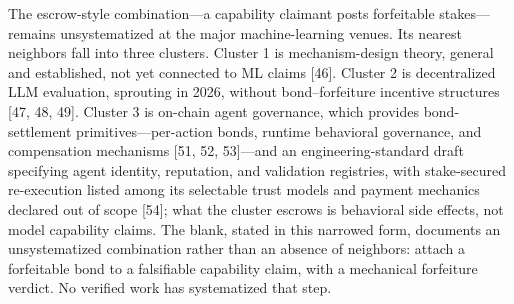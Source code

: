 \documentclass[11pt]{article}
\begin{document}
\noindent The escrow-style combination—a capability claimant posts forfeitable stakes—remains unsystematized at the major machine-learning venues. Its nearest neighbors fall into three clusters. Cluster 1 is mechanism-design theory, general and established, not yet connected to ML claims [46]. Cluster 2 is decentralized LLM evaluation, sprouting in 2026, without bond–forfeiture incentive structures [47, 48, 49]. Cluster 3 is on-chain agent governance, which provides bond-settlement primitives—per-action bonds, runtime behavioral governance, and compensation mechanisms [51, 52, 53]—and an engineering-standard draft specifying agent identity, reputation, and validation registries, with stake-secured re-execution listed among its selectable trust models and payment mechanics declared out of scope [54]; what the cluster escrows is behavioral side effects, not model capability claims. The blank, stated in this narrowed form, documents an unsystematized combination rather than an absence of neighbors: attach a forfeitable bond to a falsifiable capability claim, with a mechanical forfeiture verdict. No verified work has systematized that step.\par
\end{document}
